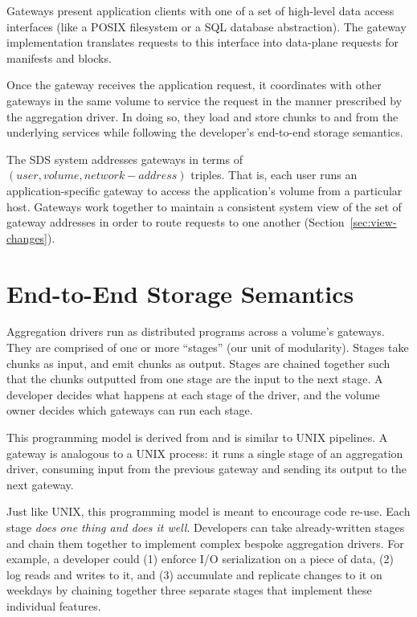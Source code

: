 Gateways present application clients with one of a set of high-level data access
interfaces (like a POSIX filesystem or a SQL database abstraction).
The gateway implementation translates requests to this interface
into data-plane requests for manifests and blocks.

Once the gateway receives the application request, it coordinates with other
gateways in the same volume to service the request in the manner prescribed by
the aggregation driver.  In doing so, they load and store chunks to and from the
underlying services while following the developer's end-to-end storage
semantics.

The SDS system addresses gateways in terms of $(user, volume, network-address)$
triples.  That is, each user runs an application-specific gateway to access the
application's volume from a particular host.  Gateways work together to maintain
a consistent system view of the set of gateway addresses in order to route
requests to one another (Section~\ref{sec:view-changes}).

\section{End-to-End Storage Semantics}
\label{sec:aggregation-driver-model}

Aggregation drivers run as distributed programs across a volume's gateways.
They are comprised of one or more ``stages'' (our unit of modularity).  Stages take chunks as input, and
emit chunks as output.  Stages are chained together such that the chunks
outputted from one stage are the input to the next stage.  A developer decides what
happens at each stage of the driver, and the
volume owner decides which gateways can run each stage.

This programming model is derived from and is similar to UNIX pipelines.
A gateway is analogous to a UNIX process:  it
runs a single stage of an aggregation driver, consuming input from the previous
gateway and sending its output to the next gateway.

Just like UNIX, this programming model is meant to encourage code re-use.  Each stage
\emph{does one thing and does it well}.  Developers can take already-written stages
and chain them together to implement complex bespoke aggregation drivers.  For
example, a developer could (1) enforce I/O serialization on a piece of data, (2) log
reads and writes to it, and (3) accumulate and replicate changes to it on
weekdays by chaining together three separate stages that implement these
individual features.

